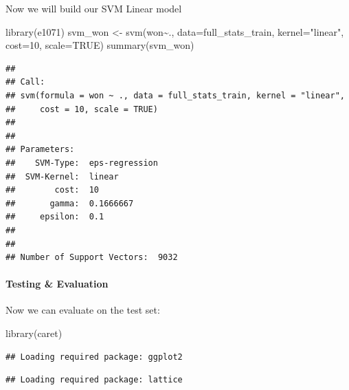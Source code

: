 \documentclass[
]{article}
\newenvironment{Shaded}{\begin{snugshade}}{\end{snugshade}}
\newcommand{\AttributeTok}[1]{\textcolor[rgb]{0.77,0.63,0.00}{#1}}
\newcommand{\ConstantTok}[1]{\textcolor[rgb]{0.00,0.00,0.00}{#1}}
\newcommand{\DecValTok}[1]{\textcolor[rgb]{0.00,0.00,0.81}{#1}}
\newcommand{\FloatTok}[1]{\textcolor[rgb]{0.00,0.00,0.81}{#1}}
\newcommand{\FunctionTok}[1]{\textcolor[rgb]{0.00,0.00,0.00}{#1}}
\newcommand{\NormalTok}[1]{#1}
\newcommand{\OtherTok}[1]{\textcolor[rgb]{0.56,0.35,0.01}{#1}}
\newcommand{\SpecialCharTok}[1]{\textcolor[rgb]{0.00,0.00,0.00}{#1}}
\newcommand{\StringTok}[1]{\textcolor[rgb]{0.31,0.60,0.02}{#1}}
\begin{document}
Now we will build our SVM Linear model

\begin{Shaded}
\begin{Highlighting}[]
\FunctionTok{library}\NormalTok{(e1071)}
\NormalTok{svm\_won }\OtherTok{\textless{}{-}} \FunctionTok{svm}\NormalTok{(won}\SpecialCharTok{\textasciitilde{}}\NormalTok{., }\AttributeTok{data=}\NormalTok{full\_stats\_train, }\AttributeTok{kernel=}\StringTok{"linear"}\NormalTok{, }\AttributeTok{cost=}\DecValTok{10}\NormalTok{, }\AttributeTok{scale=}\ConstantTok{TRUE}\NormalTok{)}
\FunctionTok{summary}\NormalTok{(svm\_won)}
\end{Highlighting}
\end{Shaded}

\begin{verbatim}
## 
## Call:
## svm(formula = won ~ ., data = full_stats_train, kernel = "linear", 
##     cost = 10, scale = TRUE)
## 
## 
## Parameters:
##    SVM-Type:  eps-regression 
##  SVM-Kernel:  linear 
##        cost:  10 
##       gamma:  0.1666667 
##     epsilon:  0.1 
## 
## 
## Number of Support Vectors:  9032
\end{verbatim}

\hypertarget{testing-evaluation}{%
\paragraph{Testing \& Evaluation}\label{testing-evaluation}}

Now we can evaluate on the test set:

\begin{Shaded}
\begin{Highlighting}[]
\FunctionTok{library}\NormalTok{(caret)}
\end{Highlighting}
\end{Shaded}

\begin{verbatim}
## Loading required package: ggplot2
\end{verbatim}

\begin{verbatim}
## Loading required package: lattice
\end{verbatim}

\begin{Shaded}
\end{Shaded}
\end{document}
